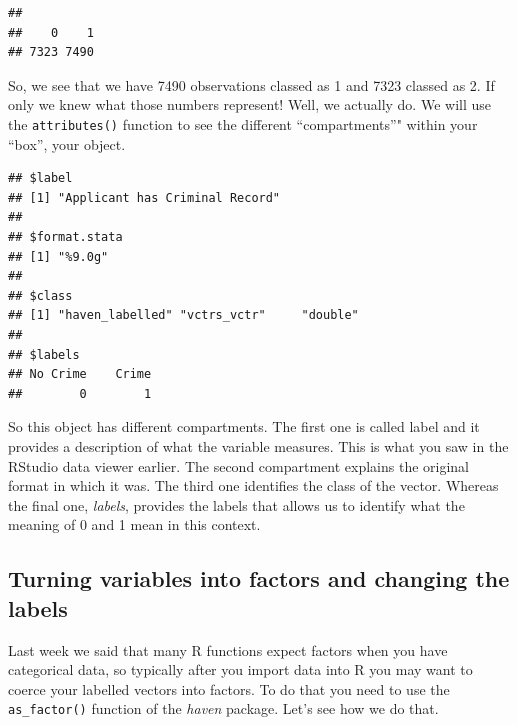 \documentclass[
]{book}
\newenvironment{Shaded}{\begin{snugshade}}{\end{snugshade}}
\newcommand{\FunctionTok}[1]{\textcolor[rgb]{0.00,0.00,0.00}{#1}}
\newcommand{\NormalTok}[1]{#1}
\newcommand{\SpecialCharTok}[1]{\textcolor[rgb]{0.00,0.00,0.00}{#1}}
\begin{document}
\begin{Shaded}
\end{Shaded}

\begin{verbatim}
## 
##    0    1 
## 7323 7490
\end{verbatim}

So, we see that we have 7490 observations classed as 1 and 7323 classed as 2. If only we knew what those numbers represent! Well, we actually do. We will use the \texttt{attributes()} function to see the different ``compartments''" within your ``box'', your object.

\begin{Shaded}
\end{Shaded}

\begin{verbatim}
## $label
## [1] "Applicant has Criminal Record"
## 
## $format.stata
## [1] "%9.0g"
## 
## $class
## [1] "haven_labelled" "vctrs_vctr"     "double"        
## 
## $labels
## No Crime    Crime 
##        0        1
\end{verbatim}

So this object has different compartments. The first one is called label and it provides a description of what the variable measures. This is what you saw in the RStudio data viewer earlier. The second compartment explains the original format in which it was. The third one identifies the class of the vector. Whereas the final one, \emph{labels}, provides the labels that allows us to identify what the meaning of 0 and 1 mean in this context.

\hypertarget{turning-variables-into-factors-and-changing-the-labels}{%
\subsection{Turning variables into factors and changing the labels}\label{turning-variables-into-factors-and-changing-the-labels}}

Last week we said that many R functions expect factors when you have categorical data, so typically after you import data into R you may want to coerce your labelled vectors into factors. To do that you need to use the \texttt{as\_factor()} function of the \emph{haven} package. Let's see how we do that.
\end{document}
